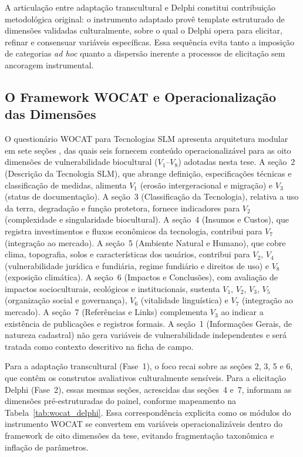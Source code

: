 A articulação entre adaptação transcultural e Delphi constitui contribuição metodológica original: o instrumento adaptado provê template estruturado de dimensões validadas culturalmente, sobre o qual o Delphi opera para elicitar, refinar e consensuar variáveis específicas. Essa sequência evita tanto a imposição de categorias \textit{ad hoc} quanto a dispersão inerente a processos de elicitação sem ancoragem instrumental.

\subsection{O Framework WOCAT e Operacionalização das Dimensões}

O questionário WOCAT para Tecnologias SLM apresenta arquitetura modular em sete seções \cite{Liniger2019}, das quais seis fornecem conteúdo operacionalizável para as oito dimensões de vulnerabilidade biocultural ($V_1$--$V_8$) adotadas nesta tese. A seção~2 (Descrição da Tecnologia SLM), que abrange definição, especificações técnicas e classificação de medidas, alimenta $V_1$ (erosão intergeracional e migração) e $V_3$ (status de documentação). A seção~3 (Classificação da Tecnologia), relativa a uso da terra, degradação e função protetora, fornece indicadores para $V_2$ (complexidade e singularidade biocultural). A seção~4 (Insumos e Custos), que registra investimentos e fluxos econômicos da tecnologia, contribui para $V_7$ (integração ao mercado). A seção~5 (Ambiente Natural e Humano), que cobre clima, topografia, solos e características dos usuários, contribui para $V_2$, $V_4$ (vulnerabilidade jurídica e fundiária, regime fundiário e direitos de uso) e $V_8$ (exposição climática). A seção~6 (Impactos e Conclusões), com avaliação de impactos socioculturais, ecológicos e institucionais, sustenta $V_1$, $V_2$, $V_3$, $V_5$ (organização social e governança), $V_6$ (vitalidade linguística) e $V_7$ (integração ao mercado). A seção~7 (Referências e Links) complementa $V_3$ ao indicar a existência de publicações e registros formais. A seção~1 (Informações Gerais, de natureza cadastral) não gera variáveis de vulnerabilidade independentes e será tratada como contexto descritivo na ficha de campo.

Para a adaptação transcultural (Fase~1), o foco recai sobre as seções 2, 3, 5 e 6, que contêm os construtos avaliativos culturalmente sensíveis. Para a elicitação Delphi (Fase~2), essas mesmas seções, acrescidas das seções~4 e~7, informam as dimensões pré-estruturadas do painel, conforme mapeamento na Tabela~\ref{tab:wocat_delphi}. Essa correspondência explicita como os módulos do instrumento WOCAT se convertem em variáveis operacionalizáveis dentro do framework de oito dimensões da tese, evitando fragmentação taxonômica e inflação de parâmetros.

